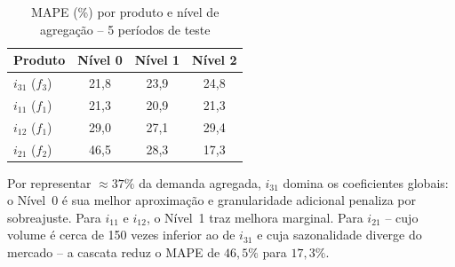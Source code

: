 \documentclass[fleqn,12pt,a4paper]{article}
\begin{document}
\begin{table}[ht]
\centering
\small
\caption{MAPE (\%) por produto e nível de agregação -- 5 períodos de teste}
\label{tab:mape}
\begin{tabular}{lccc}
\toprule
\textbf{Produto} & \textbf{Nível 0} & \textbf{Nível 1} & \textbf{Nível 2} \\
\midrule
$i_{31}$ ($f_3$) & 21,8 & 23,9 & 24,8 \\
$i_{11}$ ($f_1$) & 21,3 & 20,9 & 21,3 \\
$i_{12}$ ($f_1$) & 29,0 & 27,1 & 29,4 \\
$i_{21}$ ($f_2$) & 46,5 & 28,3 & 17,3 \\
\bottomrule
\end{tabular}
\end{table}

Por representar ${\approx}37\%$ da demanda agregada, $i_{31}$ domina os coeficientes
globais: o Nível~0 é sua melhor aproximação e granularidade adicional penaliza por
sobreajuste. Para $i_{11}$ e $i_{12}$, o Nível~1 traz melhora marginal. Para $i_{21}$
-- cujo volume é cerca de 150 vezes inferior ao de $i_{31}$ e cuja sazonalidade diverge
do mercado -- a cascata reduz o MAPE de $46{,}5\%$ para $17{,}3\%$.
\end{document}
